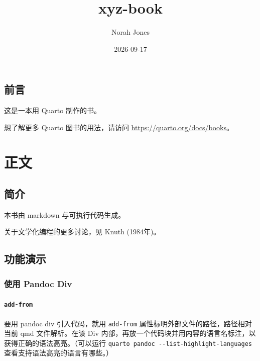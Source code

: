 \documentclass[
  chinese-hans,
  letterpaper,
  DIV=11,
  numbers=noendperiod]{scrreprt}
\title{xyz-book}
\author{Norah Jones}
\date{2026-09-17}
\renewcommand*\contentsname{目录}
\newcommand\contentsname{目录}
\begin{document}
\maketitle

\renewcommand*\contentsname{目录}
{
\setcounter{tocdepth}{2}
\tableofcontents
}


\chapter*{前言}\label{ux524dux8a00}


这是一本用 Quarto 制作的书。

想了解更多 Quarto 图书的用法，请访问
\url{https://quarto.org/docs/books}。

\part{正文}

\chapter{简介}\label{ux7b80ux4ecb}

本书由 markdown 与可执行代码生成。

关于文学化编程的更多讨论，见 Knuth (1984年)。

\chapter{功能演示}\label{ux529fux80fdux6f14ux793a}

\section{使用 Pandoc Div}\label{ux4f7fux7528-pandoc-div}

\subsection{\texorpdfstring{\texttt{add-from}}{add-from}}\label{add-from}

要用 pandoc div 引入代码，就用 \texttt{add-from}
属性标明外部文件的路径，路径相对当前 qmd 文件解析。在该 Div
内部，再放一个代码块并用内容的语言名标注，以获得正确的语法高亮。（可以运行
\texttt{quarto\ pandoc\ -\/-list-highlight-languages}
查看支持语法高亮的语言有哪些。）
\end{document}

